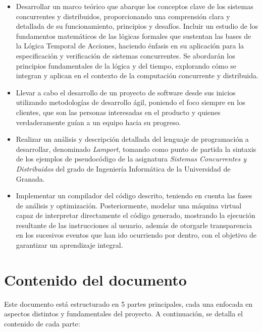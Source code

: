 \begin{itemize}
    \item Desarrollar un marco teórico que abarque los conceptos clave de los sistemas concurrentes y distribuidos, proporcionando una comprensión clara y detallada de su funcionamiento, principios y desafíos. Incluir un estudio de los fundamentos matemáticos de las lógicas formales que sustentan las bases de la Lógica Temporal de Acciones, haciendo énfasis en su aplicación para la especificación y verificación de sistemas concurrentes. Se abordarán los principios fundamentales de la lógica y del tiempo, explorando cómo se integran y aplican en el contexto de la computación concurrente y distribuida.
    \item Llevar a cabo el desarrollo de un proyecto de software desde sus inicios utilizando metodologías de desarrollo ágil, poniendo el foco siempre en los clientes, que son las personas interesadas en el producto y quienes verdaderamente guían a un equipo hacia su progreso.
    \item Realizar un análisis y descripción detallada del lenguaje de programación a desarrollar, denominado \textit{Lamport}, tomando como punto de partida la sintaxis de los ejemplos de pseudocódigo de la asignatura \textit{Sistemas Concurrentes y Distribuidos} del grado de Ingeniería Informática de la Universidad de Granada.
    \item Implementar un compilador del código descrito, teniendo en cuenta las fases de análisis y optimización. Posteriormente, modelar una máquina virtual capaz de interpretar directamente el código generado, mostrando la ejecución resultante de las instrucciones al usuario, además de otorgarle transparencia en los sucesivos eventos que han ido ocurriendo por dentro, con el objetivo de garantizar un aprendizaje integral.
\end{itemize}

\section{Contenido del documento}\label{section:documentInfo}
Este documento está estructurado en 5 partes principales, cada una enfocada en aspectos distintos y fundamentales del proyecto. A continuación, se detalla el contenido de cada parte:

